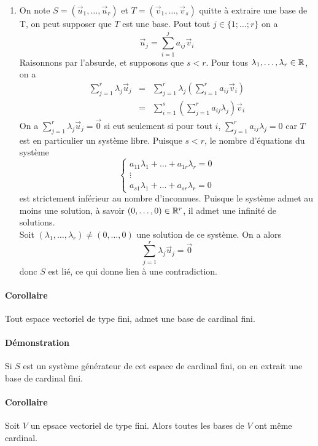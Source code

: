 \begin{enumerate}
  \item On note $S = (\vec{u}_1, \ldots, \vec{u}_r)$ et $T = (\vec{v}_1, \ldots, \vec{v}_s)$ quitte à extraire une base de T, on peut supposer que $T$ est une base. Pout tout $j \in \{1; \ldots ; r\}$ on a
    $$\vec{u}_j = \sum_{i=1}^{j} {a_{ij} \vec{v}_i}$$
    Raisonnons par l'absurde, et supposons que $s < r$. Pour tous $\lambda_1, \ldots, \lambda_r \in \mathbb{R}$, on a
    \begin{eqnarray*}
      \sum_{j=1}^r { \lambda_j \vec{u}_j} &=& \sum_{j=1}^r {\lambda_j \left( \sum_{i=1}^r {a_{ij}\vec{v}_i} \right)} \\
        &=& \sum_{i=1}^s {\left( \sum_{j=1}^r {a_{ij}\lambda_j} \right) \vec{v}_i }
    \end{eqnarray*}
    On a $\sum_{j=1}^r {\lambda_j \vec{u}_j } = \vec{0}$ si eut seulement si pour tout $i$, $\sum_{j=1}^r {a_{ij} \lambda_j } = 0$ car $T$ est en particulier un système libre. Puisque $s < r$, le nombre d'équations du système
    $$ \left\{ \begin{matrix}
      a_{11} \lambda_1 + \ldots + a_{1r} \lambda_r = 0 \\
      \vdots \\
      a_{s1} \lambda_1 + \ldots + a_{sr} \lambda_r = 0
    \end{matrix} \right. $$
    est strictement inférieur au nombre d'inconnues. Puisque le système admet au moins une solution, à savoir $(0, \ldots, 0) \in \mathbb{R}^r$, il admet une infinité de solutions. \\
    Soit $(\lambda_1, \ldots, \lambda_r) \neq (0, \ldots, 0)$ une solution de ce système. On a alors
    $$\sum_{j=1}^r {\lambda_j \vec{u}_j } = \vec{0}$$
    donc $S$ est lié, ce qui donne lien à une contradiction.
\end{enumerate}

\paragraph{Corollaire} Tout espace vectoriel de type fini, admet une base de cardinal fini.
\paragraph{Démonstration} Si $S$ est un système générateur de cet espace de cardinal fini, on en extrait une base de cardinal fini.

\paragraph{Corollaire} Soit $V$ un epsace vectoriel de type fini. Alors toutes les bases de $V$ ont même cardinal.
